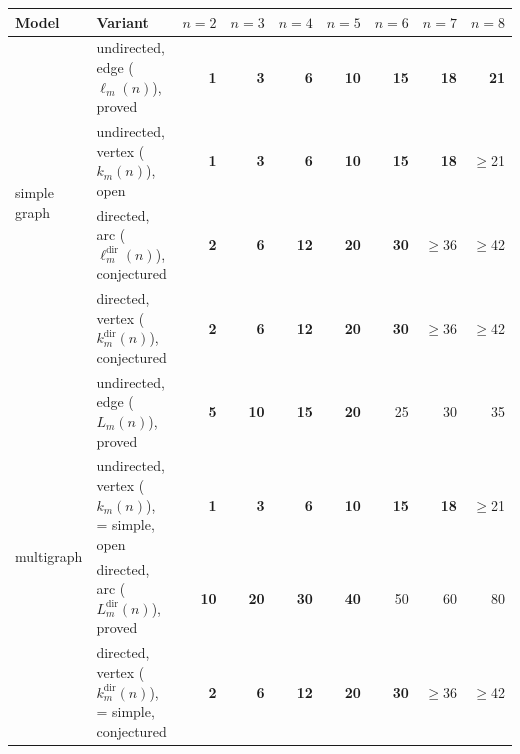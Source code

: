 \begin{tabular}{llrrrrrrr}
\toprule
Model & Variant & $n=2$ & $n=3$ & $n=4$ & $n=5$ & $n=6$ & $n=7$ & $n=8$ \\
\midrule
\multirow{4}{*}{simple graph} & undirected, edge ($\ell_m(n)$), \textcolor{vtProved}{proved} & \textcolor{vtExact}{\textbf{1}} & \textcolor{vtExact}{\textbf{3}} & \textcolor{vtExact}{\textbf{6}} & \textcolor{vtExact}{\textbf{10}} & \textcolor{vtExact}{\textbf{15}} & \textcolor{vtExact}{\textbf{18}} & \textcolor{vtExact}{\textbf{21}} \\
 & undirected, vertex ($k_m(n)$), \textcolor{vtOpen}{open} & \textcolor{vtExact}{\textbf{1}} & \textcolor{vtExact}{\textbf{3}} & \textcolor{vtExact}{\textbf{6}} & \textcolor{vtExact}{\textbf{10}} & \textcolor{vtExact}{\textbf{15}} & \textcolor{vtExact}{\textbf{18}} & \textcolor{vtOpen}{$\ge$21} \\
 & directed, arc ($\ell_m^{\mathrm{dir}}(n)$), \textcolor{vtConjectured}{conjectured} & \textcolor{vtExact}{\textbf{2}} & \textcolor{vtExact}{\textbf{6}} & \textcolor{vtExact}{\textbf{12}} & \textcolor{vtExact}{\textbf{20}} & \textcolor{vtExact}{\textbf{30}} & \textcolor{vtConjectured}{$\ge$36} & \textcolor{vtConjectured}{$\ge$42} \\
 & directed, vertex ($k_m^{\mathrm{dir}}(n)$), \textcolor{vtConjectured}{conjectured} & \textcolor{vtExact}{\textbf{2}} & \textcolor{vtExact}{\textbf{6}} & \textcolor{vtExact}{\textbf{12}} & \textcolor{vtExact}{\textbf{20}} & \textcolor{vtExact}{\textbf{30}} & \textcolor{vtConjectured}{$\ge$36} & \textcolor{vtConjectured}{$\ge$42} \\
\midrule
\multirow{4}{*}{multigraph} & undirected, edge ($L_m(n)$), \textcolor{vtProved}{proved} & \textcolor{vtExact}{\textbf{5}} & \textcolor{vtExact}{\textbf{10}} & \textcolor{vtExact}{\textbf{15}} & \textcolor{vtExact}{\textbf{20}} & \textcolor{vtProved}{25} & \textcolor{vtProved}{30} & \textcolor{vtProved}{35} \\
 & undirected, vertex ($k_m(n)$), \textcolor{vtOpen}{= simple, open} & \textcolor{vtExact}{\textbf{1}} & \textcolor{vtExact}{\textbf{3}} & \textcolor{vtExact}{\textbf{6}} & \textcolor{vtExact}{\textbf{10}} & \textcolor{vtExact}{\textbf{15}} & \textcolor{vtExact}{\textbf{18}} & \textcolor{vtOpen}{$\ge$21} \\
 & directed, arc ($L_m^{\mathrm{dir}}(n)$), \textcolor{vtProved}{proved} & \textcolor{vtExact}{\textbf{10}} & \textcolor{vtExact}{\textbf{20}} & \textcolor{vtExact}{\textbf{30}} & \textcolor{vtExact}{\textbf{40}} & \textcolor{vtProved}{50} & \textcolor{vtProved}{60} & \textcolor{vtProved}{80} \\
 & directed, vertex ($k_m^{\mathrm{dir}}(n)$), \textcolor{vtConjectured}{= simple, conjectured} & \textcolor{vtExact}{\textbf{2}} & \textcolor{vtExact}{\textbf{6}} & \textcolor{vtExact}{\textbf{12}} & \textcolor{vtExact}{\textbf{20}} & \textcolor{vtExact}{\textbf{30}} & \textcolor{vtConjectured}{$\ge$36} & \textcolor{vtConjectured}{$\ge$42} \\
\bottomrule
\end{tabular}
